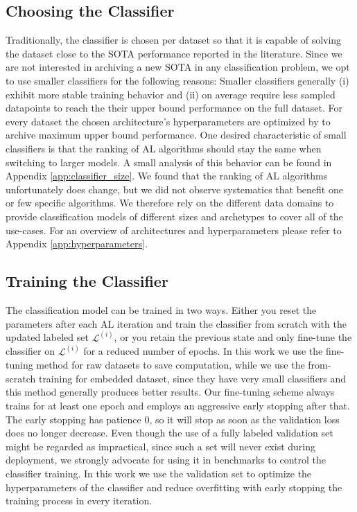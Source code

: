 \documentclass[]{article}
\begin{document}
\subsection{Choosing the Classifier}\label{sec:choosing_the_classifier}
Traditionally, the classifier is chosen per dataset so that it is capable of solving the dataset close to the SOTA performance reported in the literature.
Since we are not interested in archiving a new SOTA in any classification problem, we opt to use smaller classifiers for the following reasons:
Smaller classifiers generally (i) exhibit more stable training behavior and (ii) on average require less sampled datapoints to reach the their upper bound performance on the full dataset.
For every dataset the chosen architecture's hyperparameters are optimized by to archive maximum upper bound performance.
One desired characteristic of small classifiers is that the ranking of AL algorithms should stay the same when switching to larger models.
A small analysis of this behavior can be found in Appendix \ref{app:classifier_size}.
We found that the ranking of AL algorithms unfortunately does change, but we did not observe systematics that benefit one or few specific algorithms.
We therefore rely on the different data domains to provide classification models of different sizes and archetypes to cover all of the use-cases.
For an overview of architectures and hyperparameters please refer to Appendix \ref{app:hyperparameters}.


\subsection{Training the Classifier}\label{sec:training_the_classifier}
The classification model can be trained in two ways. Either you reset the parameters after each AL iteration and train the classifier from scratch with the updated labeled set $\mathcal{L}^{(i)}$, or you retain the previous state and only fine-tune the classifier on $\mathcal{L}^{(i)}$ for a reduced number of epochs.
In this work we use the fine-tuning method for raw datasets to save computation, while we use the from-scratch training for embedded dataset, since they have very small classifiers and this method generally produces better results.
Our fine-tuning scheme always trains for at least one epoch and employs an aggressive early stopping after that.
The early stopping has patience 0, so it will stop as soon as the validation loss does no longer decrease.
Even though the use of a fully labeled validation set might be regarded as impractical, since such a set will never exist during deployment, we strongly advocate for using it in benchmarks to control the classifier training.
In this work we use the validation set to optimize the hyperparameters of the classifier and reduce overfitting with early stopping the training process in every iteration.
\end{document}
